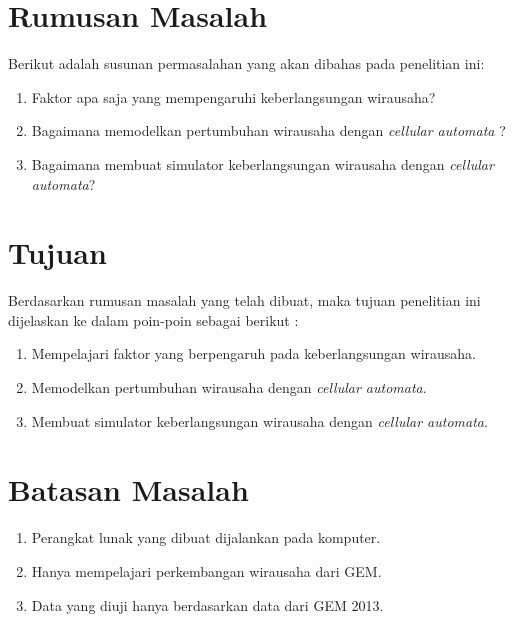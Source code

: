\section{Rumusan Masalah}
\label{sec:rumusan}
Berikut adalah susunan permasalahan yang akan dibahas pada penelitian ini:


\begin{enumerate}
	\item Faktor apa saja yang mempengaruhi keberlangsungan wirausaha?
	\item Bagaimana memodelkan pertumbuhan wirausaha dengan \textit{cellular automata} ?
	\item Bagaimana membuat simulator keberlangsungan wirausaha dengan \textit{cellular automata}?
\end{enumerate}



\section{Tujuan}
\label{sec:tujuan}
Berdasarkan rumusan masalah yang telah dibuat, maka tujuan penelitian ini dijelaskan ke dalam poin-poin sebagai berikut :


\begin{enumerate}
	\item Mempelajari faktor yang berpengaruh pada keberlangsungan wirausaha.
	\item Memodelkan pertumbuhan wirausaha dengan \textit{cellular automata}.
	\item Membuat simulator keberlangsungan wirausaha dengan \textit{cellular automata}.
\end{enumerate}

\section{Batasan Masalah}
\label{sec:batasan}
\begin{enumerate}
	\item Perangkat lunak yang dibuat dijalankan pada komputer.
	\item Hanya mempelajari perkembangan wirausaha dari GEM.
	\item Data yang diuji hanya berdasarkan data dari GEM 2013.
\end{enumerate}



